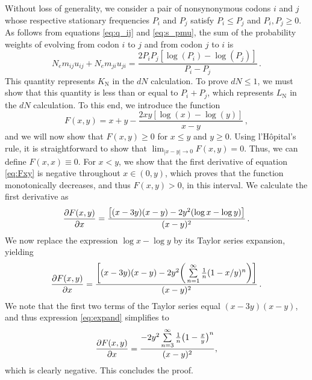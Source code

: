 \documentclass[11pt]{article}
\begin{document}
Without loss of generality, we consider a pair of nonsynonymous codons $i$ and $j$ whose respective stationary frequencies $P_i$ and $P_j$ satisfy $P_i \leq P_j$ and $P_i, P_j \geq 0$. As follows from equations \eqref{eq:q_ij} and \eqref{eq:s_pmu}, the sum of the probability weights of evolving from codon $i$ to $j$ and from codon $j$ to $i$ is
\begin{equation}
N_em_{ij} u_{ij} + N_em_{ji} u_{ji}  = \frac{2P_iP_j[\log(P_i) - \log(P_j)]}{P_i - P_j} \,.
\end{equation}
This quantity represents $K_\text{N}$ in the $dN$ calculation. To prove $dN \leq 1$, we must show that this quantity is less than or equal to $P_i + P_j$, which represents $L_\text{N}$ in the $dN$ calculation. To this end, we introduce the function 
\begin{equation}\label{eq:Fxy}
F(x,y) = x + y - \frac{2xy[\log(x) - \log(y)]}{x - y} \,,
\end{equation}
and we will now show that $F(x,y) \geq 0$ for $x \leq y$ and $y \geq 0 $. Using l'H\^{o}pital's rule, it is straightforward to show that $\lim_{|x - y| \to 0}F(x,y) = 0$. Thus, we can define $F(x,x) \equiv 0$. For $x < y$, we show that the first derivative of equation \eqref{eq:Fxy} is negative throughout $x \in (0,y)$, which proves that the function monotonically decreases, and thus $F(x,y) > 0$, in this interval. We calculate the first derivative as 
\begin{equation}
\frac{\partial{F(x,y)}}{\partial{x}} = \frac{\big{[} (x-3y)(x-y) - 2y^2(\log{x} - \log{y}) \big{]}}{(x-y)^2} \,.
\end{equation}
We now replace the expression $\log{x} - \log{y}$ by its Taylor series expansion, yielding
\begin{equation}\label{eq:expand}
	\frac{\partial{F(x,y)}}{\partial{x}} = 
	\frac{ \bigg{[} (x-3y)(x-y) - 2y^2\bigg{(}\sum\limits_{n=1}^\infty \frac{1}{n} (1-x/y)^n\bigg{)} \bigg{]}}{(x-y)^2} \,.
\end{equation} We note that the first two terms of the Taylor series equal $(x-3y)(x-y)$, and thus expression \eqref{eq:expand} simplifies to 
\begin{equation}
\frac{\partial{F(x,y)}}{\partial{x}} = \frac{-2y^2\sum\limits_{n=3}^\infty \frac{1}{n} \big{(}1-\frac{x}{y}\big{)}^n}{(x-y)^2} ,
\end{equation}
which is clearly negative. This concludes the proof.


\bigskip
\end{document}

